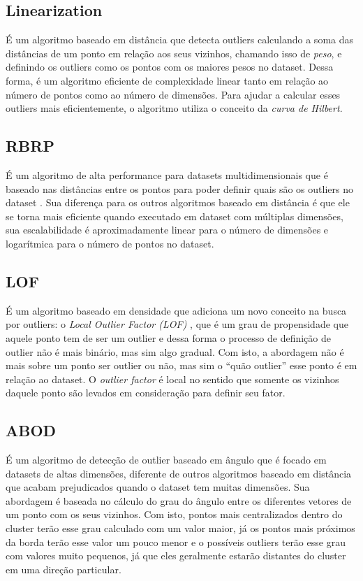 \subsection{Linearization}

É um algoritmo baseado em distância \cite{10.1007/3-540-45681-3_2} que detecta outliers calculando a soma das distâncias de um ponto em relação aos seus vizinhos, chamando isso de \textit{peso}, e definindo os outliers como os pontos com os maiores pesos no dataset. Dessa forma, é um algoritmo eficiente de complexidade linear tanto em relação ao número de pontos como ao número de dimensões. Para ajudar a calcular esses outliers mais eficientemente, o algoritmo utiliza o conceito da \textit{curva de Hilbert}.

\subsection{RBRP}

É um algoritmo de alta performance para datasets multidimensionais que é baseado nas distâncias entre os pontos para poder definir quais são os outliers no dataset \cite{Ghoting2006}. Sua diferença para os outros algoritmos baseado em distância é que ele se torna mais eficiente quando executado em dataset com múltiplas dimensões, sua escalabilidade é aproximadamente linear para o número de dimensões e logarítmica para o número de pontos no dataset.

\subsection{LOF}

É um algoritmo baseado em densidade que adiciona um novo conceito na busca por outliers: o \textit{Local Outlier Factor (LOF)} \cite{Breunig:2000:LID:335191.335388}, que é um grau de propensidade que aquele ponto tem de ser um outlier e dessa forma o processo de definição de outlier não é mais binário, mas sim algo gradual. Com isto, a abordagem não é mais sobre um ponto ser outlier ou não, mas sim o ``quão outlier'' esse ponto é em relação ao dataset. O \textit{outlier factor} é local no sentido que somente os vizinhos daquele ponto são levados em consideração para definir seu fator.

\subsection{ABOD}

É um algoritmo de detecção de outlier baseado em ângulo \cite{Kriegel:2008:AOD:1401890.1401946} que é focado em datasets de altas dimensões, diferente de outros algoritmos baseado em distância que acabam prejudicados quando o dataset tem muitas dimensões. Sua abordagem é baseada no cálculo do grau do ângulo entre os diferentes vetores de um ponto com os seus vizinhos. Com isto, pontos mais centralizados dentro do cluster terão esse grau calculado com um valor maior, já os pontos mais próximos da borda terão esse valor um pouco menor e o possíveis outliers terão esse grau com valores muito pequenos, já que eles geralmente estarão distantes do cluster em uma direção particular. 

